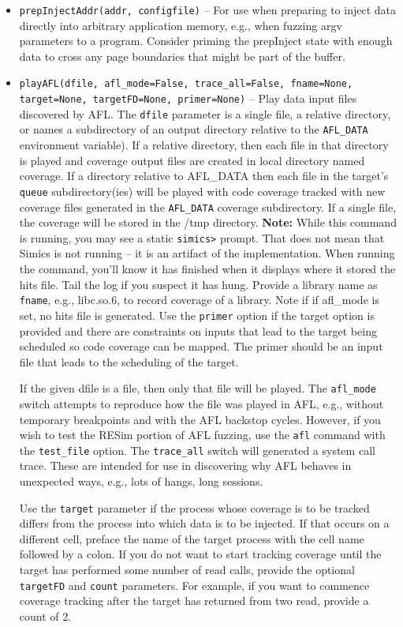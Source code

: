 \documentclass[titlepage]{article}
\begin{document}
\begin{itemize}
\item{\tt prepInjectAddr(addr, configfile)} -- For use when preparing to inject data directly into arbitrary application memory, e.g., when fuzzing argv parameters
to a program.  Consider priming the prepInject state with enough data to cross any page boundaries that might be part of the buffer.

\item{\tt playAFL(dfile, afl\_mode=False, trace\_all=False, fname=None, target=None, targetFD=None, primer=None)} -- Play data input files discovered by AFL.  The {\tt dfile} parameter 
is a single file, a relative directory, or names a subdirectory of an output directory relative to the {\tt AFL\_DATA} environment variable).  
If a relative directory, then each file in that directory is played and coverage output files are created in local directory named coverage.
If a directory relative to AFL\_DATA then each file in the target's {\tt queue} subdirectory(ies) will be played with code coverage tracked with new coverage files generated in the {\tt AFL\_DATA} 
coverage subdirectory.  If a single file, the coverage will be stored in the /tmp directory.
\textbf{Note:} While this command is running, you may see a static {\tt simics>} prompt.  That does not mean that Simics is not running -- it is an artifact of the implementation.  When running the command, you'll know it has finished when it displays where it stored the hits file.
Tail the log if you suspect it has hung.  Provide a library name as {\tt fname}, e.g., libc.so.6, to record coverage of a library.  Note if if afl\_mode is set, no hits file is generated.  
Use the {\tt primer} option if the target option is provided and there are constraints on inputs that lead to the target being scheduled 
so code coverage can be mapped.  The primer should be an input file that leads to the scheduling of the target.

If the given dfile is a file, then only that file will be played.  The {\tt afl\_mode} switch attempts to reproduce how the file was played in AFL, e.g., without temporary
breakpoints and with the AFL backstop cycles. However, if you wish to test the RESim portion of AFL fuzzing, use the {\tt afl} command with the {\tt test\_file} option.  
The {\tt trace\_all} switch will generated a system call trace.  These are intended for use in discovering why AFL
behaves in unexpected ways, e.g., lots of hangs, long sessions.

Use the {\tt target} parameter if the process whose coverage is to be tracked differs from the process into which data is to be injected.  If that occurs
on a different cell, preface the name of the target process with the cell name followed by a colon.  If you do not want to start tracking coverage
until the target has performed some number of read calls, provide the optional {\tt targetFD} and {\tt count} parameters.  For example, if you want to
commence coverage tracking after the target has returned from two read, provide a count of 2.


\end{itemize}
\end{document}
